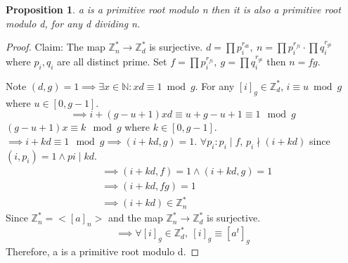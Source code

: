 \documentclass{article}
\newtheorem*{prop}{Proposition}
\theoremstyle{definition}\newtheorem{definition}{Definition}
\begin{document}
	\begin{prop}
		a is a primitive root modulo n then it is also a primitive root modulo d, for any d dividing n.
	\end{prop}
	\begin{proof}
		Claim: The map $\mathbb{Z}_{n}^{*} \rightarrow \mathbb{Z}_{d}^*$  is surjective. $d=\prod p_i^{r_{di}} , \  n=\prod p_i^{r_{fi}} \cdot \prod q_i^{r_{gi}}$ where $p_i, q_i$ are all distinct prime. Set $f=\prod p_i^{r_{fi}} , \  g=\prod q_i^{r_{gi}}$ then $n=fg$.
		
		Note $(d,g)=1 \implies \exists x \in \mathbb{N} : xd\equiv 1 \bmod g$. For any $ [i]_g \in \mathbb{Z}_{d}^*$, $i\equiv u \bmod g$ where $u\in [0, g-1]$.
		$$
			\implies i+(g-u+1)xd \equiv u+g-u+1 \equiv 1 \mod g
		$$
		$ (g-u+1)x \equiv k \mod g  $ where $k \in [0, g-1]$. $\implies i+kd\equiv 1 \mod g \implies (i+kd,g)=1$. $\forall p_i : p_i \mid f$, $p_i \nmid (i+kd)$ since $(i, p_i)=1 \land pi\mid kd$.
		\begin{align*}
			&\implies (i+kd, f)=1 \land (i+kd, g)=1	\\
			&\implies (i+kd, fg)=1 \\
			&\implies (i+kd) \in \mathbb{Z}_{n}^{*}
		\end{align*}
		Since $\mathbb{Z}_{n}^{*}=<[a]_n>$ and the map $\mathbb{Z}_{n}^{*} \rightarrow \mathbb{Z}_{d}^*$  is surjective. 
		$$\implies  \forall [i]_g \in \mathbb{Z}_{d}^* ,\ [i]_g\equiv [a^t]_g$$
		Therefore, a is a primitive root modulo d.		
	\end{proof}
\end{document}
